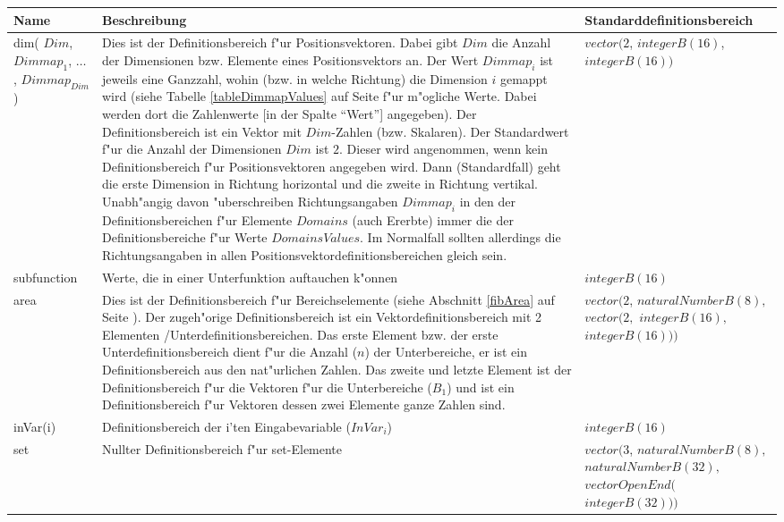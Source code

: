 \begin{small}
\begin{center}
\begin{longtable}{|p{18mm}|p{65mm}|p{35mm}|}\hline
	Name & Beschreibung & Standarddefinitions\-bereich \\\hline\endhead
	dim( $Dim$, $Dimmap_1$, $\ldots$, $Dimmap_{Dim}$ ) & Dies ist der Definitionsbereich f"ur Positionsvektoren. Dabei gibt $Dim$ die Anzahl der Dimensionen bzw. Elemente eines Positionsvektors an. Der Wert $Dimmap_i$ ist jeweils eine Ganzzahl, wohin (bzw. in welche Richtung) die Dimension $i$ gemappt wird (siehe Tabelle \ref{tableDimmapValues} auf Seite \pageref{tableDimmapValues} f"ur m"ogliche Werte. Dabei werden dort die Zahlenwerte [in der Spalte ``Wert''] angegeben). Der Definitionsbereich ist ein Vektor mit $Dim$-Zahlen (bzw. Skalaren). Der Standardwert f"ur die Anzahl der Dimensionen $Dim$ ist $2$. Dieser wird angenommen, wenn kein Definitionsbereich f"ur Positionsvektoren angegeben wird. Dann (Standardfall) geht die erste Dimension in Richtung horizontal und die zweite in Richtung vertikal. Unabh"angig davon "uberschreiben Richtungsangaben $Dimmap_i$ in den der Definitionsbereichen f"ur Elemente $Domains$ (auch Ererbte) immer die der Definitionsbereiche f"ur Werte $DomainsValues$. Im Normalfall sollten allerdings die Richtungsangaben in allen Positionsvektordefinitionsbereichen gleich sein. & $vector( 2$, $integerB(16)$, $integerB(16) )$  \\\hline
	subfunction & Werte, die in einer Unterfunktion auftauchen k"onnen & $integerB(16)$ \\\hline
	area & Dies ist der Definitionsbereich f"ur Bereichselemente (siehe Abschnitt \ref{fibArea} auf Seite \pageref{fibArea}). Der zugeh"orige Definitionsbereich ist ein Vektordefinitionsbereich mit 2 Elementen /Unterdefinitionsbereichen. Das erste Element bzw. der erste Unterdefinitionsbereich dient f"ur die Anzahl ($n$) der Unterbereiche, er ist ein Definitionsbereich aus den nat"urlichen Zahlen. Das zweite und letzte Element ist der Definitionsbereich f"ur die Vektoren f"ur die Unterbereiche ($B_{1}$) und ist ein Definitionsbereich f"ur Vektoren dessen zwei Elemente ganze Zahlen sind. & $vector( 2$, $naturalNumberB(8),$ $vector( 2,$ $integerB(16),$ $integerB(16) ) )$  \\\hline
	inVar(i) & Definitionsbereich der i'ten Eingabevariable ($InVar_i$) & $integerB(16)$ \\\hline
	set & Nullter Definitionsbereich f"ur set-Elemente & $vector( 3$, $naturalNumberB(8),$ $naturalNumberB(32),$ $vectorOpenEnd($ $integerB(32) ) )$ \\\hline

\end{longtable}
\end{center}
\end{small}
